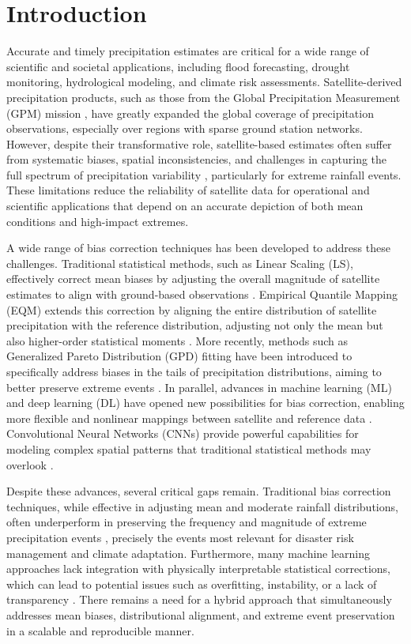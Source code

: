 \documentclass[remotesensing,article,submit,pdftex,moreauthors]{Definitions/mdpi}
\begin{document}
\section{Introduction}\label{introduction}

Accurate and timely precipitation estimates are critical for a wide
range of scientific and societal applications, including flood
forecasting, drought monitoring, hydrological modeling, and climate risk
assessments. Satellite-derived precipitation products, such as those
from the Global Precipitation Measurement (GPM) mission \cite{ref1,ref2}, have
greatly expanded the global coverage of precipitation observations,
especially over regions with sparse ground station networks. However,
despite their transformative role, satellite-based estimates often
suffer from systematic biases, spatial inconsistencies, and challenges
in capturing the full spectrum of precipitation variability \cite{ref3},
particularly for extreme rainfall events. These limitations reduce the
reliability of satellite data for operational and scientific
applications that depend on an accurate depiction of both mean
conditions and high-impact extremes.

A wide range of bias correction techniques has been developed to address
these challenges. Traditional statistical methods, such as Linear
Scaling (LS), effectively correct mean biases by adjusting the overall
magnitude of satellite estimates to align with ground-based observations
\cite{ref4}. Empirical Quantile Mapping (EQM) extends this correction by
aligning the entire distribution of satellite precipitation with the
reference distribution, adjusting not only the mean but also
higher-order statistical moments \cite{ref5,ref6}. More recently, methods such
as Generalized Pareto Distribution (GPD) fitting have been introduced to
specifically address biases in the tails of precipitation distributions,
aiming to better preserve extreme events \cite{ref7}. In parallel, advances
in machine learning (ML) and deep learning (DL) have opened new
possibilities for bias correction, enabling more flexible and nonlinear
mappings between satellite and reference data \cite{ref8}. Convolutional
Neural Networks (CNNs) provide powerful capabilities for modeling
complex spatial patterns that traditional statistical methods may
overlook \cite{ref9,ref10}.

Despite these advances, several critical gaps remain. Traditional bias
correction techniques, while effective in adjusting mean and moderate
rainfall distributions, often underperform in preserving the frequency
and magnitude of extreme precipitation events \cite{ref8,ref11}, precisely the
events most relevant for disaster risk management and climate
adaptation. Furthermore, many machine learning approaches lack
integration with physically interpretable statistical corrections, which
can lead to potential issues such as overfitting, instability, or a lack
of transparency \cite{ref12}. There remains a need for a hybrid approach
that simultaneously addresses mean biases, distributional alignment, and
extreme event preservation in a scalable and reproducible manner.
\end{document}
